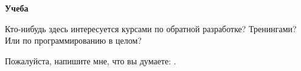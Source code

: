 \vspace*{\fill}

\large \textbf{Учеба}

\bigskip
\bigskip
\bigskip

Кто-нибудь здесь интересуется курсами по обратной разработке? Тренингами?
Или по программированию в целом?

Пожалуйста, напишите мне, что вы думаете: \EMAILS.

\normalsize

\bigskip
\bigskip
\bigskip

\vspace*{\fill}
\vfill

